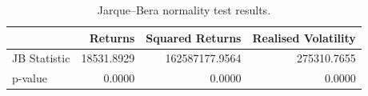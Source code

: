 \begin{table}[htbp]
\centering
\begin{tabular}{lrrr}
\toprule
 & Returns & Squared Returns & Realised Volatility \\
\midrule
JB Statistic & 18531.8929 & 162587177.9564 & 275310.7655 \\
p-value & 0.0000 & 0.0000 & 0.0000 \\
\bottomrule
\end{tabular}
\caption{Jarque–Bera normality test results.}
\label{tab:jarque_bera}
\end{table}
